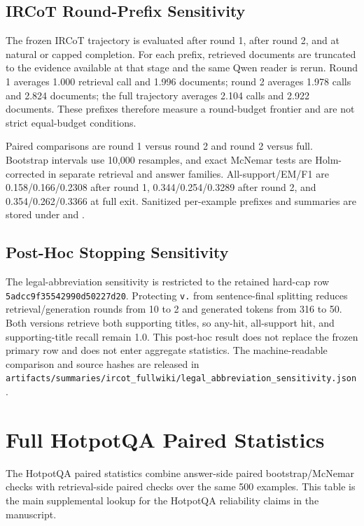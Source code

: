 \documentclass[pdflatex,sn-basic,Numbered]{sn-jnl}
\begin{document}
\subsection{IRCoT Round-Prefix Sensitivity}

The frozen IRCoT trajectory is evaluated after round 1, after round 2, and at
natural or capped completion. For each prefix, retrieved documents are truncated
to the evidence available at that stage and the same Qwen reader is rerun. Round
1 averages 1.000 retrieval call and 1.996 documents; round 2 averages 1.978 calls
and 2.824 documents; the full trajectory averages 2.104 calls and 2.922 documents.
These prefixes therefore measure a round-budget frontier and are not strict
equal-budget conditions.

Paired comparisons are round 1 versus round 2 and round 2 versus full. Bootstrap
intervals use 10,000 resamples, and exact McNemar tests are Holm-corrected in
separate retrieval and answer families. All-support/EM/F1 are
0.158/0.166/0.2308 after round 1, 0.344/0.254/0.3289 after round 2, and
0.354/0.262/0.3366 at full exit. Sanitized per-example prefixes and summaries are
stored under  and
.

\subsection{Post-Hoc Stopping Sensitivity}

The legal-abbreviation sensitivity is restricted to the retained hard-cap row
\texttt{5adcc9f35542990d50227d20}. Protecting \texttt{v.} from sentence-final
splitting reduces retrieval/generation rounds from 10 to 2 and generated tokens
from 316 to 50. Both versions retrieve both supporting titles, so any-hit,
all-support hit, and supporting-title recall remain 1.0. This post-hoc result
does not replace the frozen primary row and does not enter aggregate statistics.
The machine-readable comparison and source hashes are released in
\texttt{artifacts/summaries/ircot\_fullwiki/legal\_abbreviation\_sensitivity.json}.

\FloatBarrier

\section{Full HotpotQA Paired Statistics}
\label{sec:supp_hotpotqa_paired_statistics}

The HotpotQA paired statistics combine answer-side paired bootstrap/McNemar checks with retrieval-side paired checks over the same 500 examples. This table is the main supplemental lookup for the HotpotQA reliability claims in the manuscript.
\end{document}
